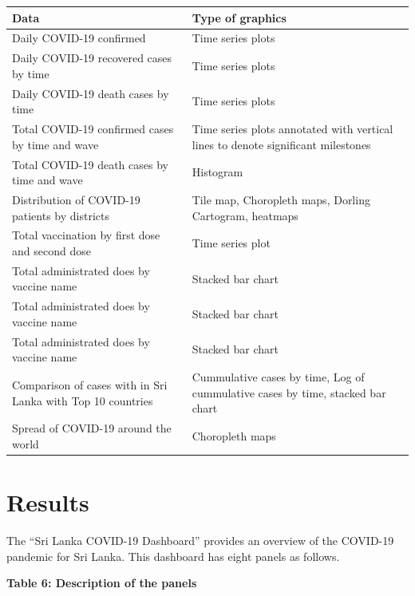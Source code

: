 \documentclass[
]{article}
\begin{document}
\begin{longtable}[]{@{}
  >{\raggedright\arraybackslash}p{}
  >{\raggedright\arraybackslash}p{}@{}}
\toprule
\textbf{Data} & \textbf{Type of graphics} \\
\midrule
\endhead
Daily COVID-19 confirmed & Time series plots \hfill\break \\
Daily COVID-19 recovered cases by time & Time series plots
\hfill\break \\
Daily COVID-19 death cases by time & Time series plots \hfill\break \\
Total COVID-19 confirmed cases by time and wave & Time series plots
annotated with vertical lines to denote significant milestones
\hfill\break \\
Total COVID-19 death cases by time and wave & Histogram \hfill\break \\
Distribution of COVID-19 patients by districts & Tile map, Choropleth
maps, Dorling Cartogram, heatmaps \hfill\break \\
Total vaccination by first dose and second dose & Time series plot
\hfill\break \\
Total administrated does by vaccine name & Stacked bar chart
\hfill\break \\
Total administrated does by vaccine name & Stacked bar chart
\hfill\break \\
Total administrated does by vaccine name & Stacked bar chart
\hfill\break \\
Comparison of cases with in Sri Lanka with Top 10 countries &
Cummulative cases by time, Log of cummulative cases by time, stacked bar
chart \hfill\break \\
Spread of COVID-19 around the world & Choropleth maps \hfill\break \\
\bottomrule
\end{longtable}

\hypertarget{results}{%
\section{Results}\label{results}}

The ``Sri Lanka COVID-19 Dashboard'' provides an overview of the
COVID-19 pandemic for Sri Lanka. This dashboard has eight panels as
follows.

\textbf{Table 6: Description of the panels}
\end{document}

